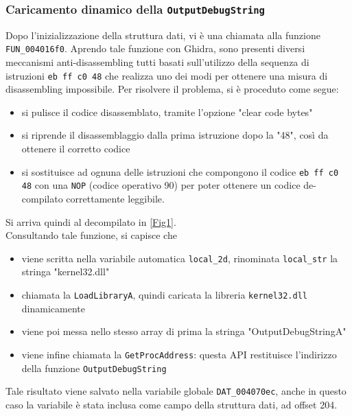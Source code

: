 \documentclass{article}
\begin{document}
\subsubsection{Caricamento dinamico della \texttt{OutputDebugString}}
Dopo l'inizializzazione della struttura dati, vi è una chiamata alla funzione \texttt{FUN\_004016f0}. Aprendo tale funzione con Ghidra, sono presenti diversi meccanismi anti-disassembling tutti basati sull'utilizzo della sequenza di istruzioni \texttt{eb ff c0 48} che realizza uno dei modi per ottenere una misura di disassembling impossibile. Per risolvere il problema, si è proceduto come segue:
\begin{itemize}
\item si pulisce il codice disassemblato, tramite l'opzione "clear code bytes"
\item si riprende il disassemblaggio dalla prima istruzione dopo la "48", così da ottenere il corretto codice
\item si sostituisce ad ognuna delle istruzioni che compongono il codice \texttt{eb ff c0 48} con una \texttt{NOP} (codice operativo 90) per poter ottenere un codice de-compilato correttamente leggibile.
\end{itemize}
Si arriva quindi al decompilato in \ref{Fig1}.\\Consultando tale funzione, si capisce che
\begin{itemize}
\item viene scritta nella variabile automatica \texttt{local\_2d}, rinominata \texttt{local\_str} la stringa "kernel32.dll"
\item chiamata la \texttt{LoadLibraryA}, quindi caricata la libreria \texttt{kernel32.dll} dinamicamente
\item viene poi messa nello stesso array di prima la stringa "OutputDebugStringA"
\item viene infine chiamata la \texttt{GetProcAddress}: questa API restituisce l'indirizzo della funzione \texttt{OutputDebugString}
\end{itemize}
Tale risultato viene salvato nella variabile globale \texttt{DAT\_004070ec}, anche in questo caso la variabile è stata inclusa come campo della struttura dati, ad offset 204.
\end{document}
